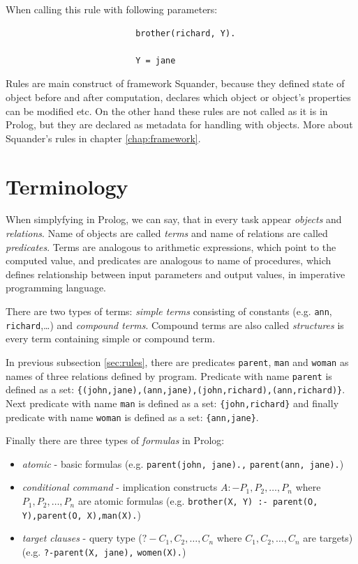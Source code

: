 \documentclass[11pt,twoside,a4paper]{book}
\begin{document}
When calling this rule with following parameters:
\begin{verbatim}
                          brother(richard, Y).
                          
                          Y = jane
\end{verbatim}
Rules are main construct of framework Squander, because they defined state of
object before and after computation, declares which object or object's
properties can be modified etc. On the other hand these rules are not called as
it is in Prolog, but they are declared as metadata for handling with objects.
More about Squander's rules in chapter \ref{chap:framework}.

\section{Terminology}
When simplyfying in Prolog, we can say, that in every task appear
\textit{objects} and \textit{relations}. Name of objects are called
\textit{terms} and name of relations are called \textit{predicates}. Terms are
analogous to arithmetic expressions, which point to the computed value, and
predicates are analogous to name of procedures, which defines relationship
between input parameters and output values, in imperative programming language.

There are two types of terms: \textit{simple terms} consisting of constants
(e.g. \verb|ann|, \verb|richard|,\ldots) and \textit{compound terms}. Compound
terms are also called \textit{structures} is every term containing simple
or compound term.

In previous subsection \ref{sec:rules}, there are predicates \verb|parent|,
\verb|man| and \verb|woman| as names of three relations defined by program.
Predicate with name \verb|parent| is defined as a set:
\verb|{(john,jane),(ann,jane),(john,richard),(ann,richard)}|. Next predicate
with name \verb|man| is defined as a set:
\verb|{john,richard}| and finally predicate
with name \verb|woman| is defined as a set:
\verb|{ann,jane}|. 

Finally there are three types of \textit{formulas} in Prolog:
\begin{itemize}
  \item \textit{atomic} - basic formulas (e.g. \verb|parent(john, jane).,|
  \verb|parent(ann, jane).|)
  \item \textit{conditional command} - implication constructs $A :- P_1,
  P_2,\ldots, P_n$ where $P_1, P_2,\ldots, P_n$ are atomic formulas
  (e.g. \verb|brother(X, Y) :- parent(O, Y),parent(O, X),man(X).|)
  \item \textit{target clauses} - query type ($?-C_1, C_2,\ldots, C_n$ where
  $C_1, C_2,\ldots, C_n$ are targets)\\ (e.g. \verb|?-parent(X, jane),|
  \verb|women(X).|)
\end{itemize} 
\end{document}
